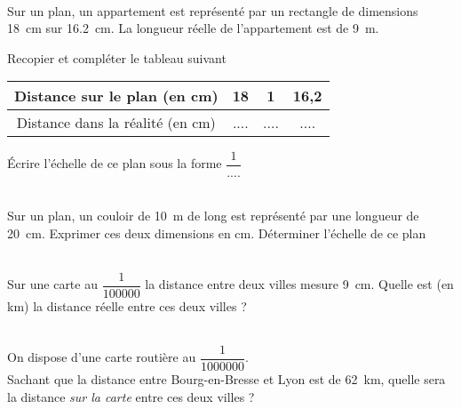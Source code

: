 \documentclass[../Cours.tex]{subfiles}
\begin{document}
\begin{questions}

\exercice\\ Sur un plan, un appartement est représenté par un rectangle de dimensions \qty{18}{cm} sur \qty{16,2}{cm}. La longueur réelle de l'appartement est de \qty{9}{m}.

\question Recopier et compléter le tableau suivant 
\begin{center}
\begin{tabular}{|c|c|c|c|}\hline
    Distance sur le plan (en \unit{cm}) & 18 & 1 & 16,2 \\\hline
    Distance dans la réalité (en \unit{cm}) & .... & .... & ....\\\hline
\end{tabular}
\end{center}

\question Écrire l'échelle de ce plan sous la forme $\dfrac{1}{....}$


\exercice\\ Sur un plan, un couloir de \qty{10}{m} de long est représenté par une longueur de \qty{20}{cm}.
\question Exprimer ces deux dimensions en \unit{cm}.
\question Déterminer l'échelle de ce plan

\exercice\\ Sur une carte au $\dfrac{1}{100000}$ la distance entre deux villes mesure \qty{9}{cm}.
\question Quelle est (en \unit{km}) la distance réelle entre ces deux villes ?

\exercice\\ On dispose d'une carte routière au $\dfrac{1}{1000000}$. \\Sachant que la distance entre Bourg-en-Bresse et Lyon est de \qty{62}{km}, quelle sera la distance \emph{sur la carte} entre ces deux villes ?

\end{questions}
\end{document}
